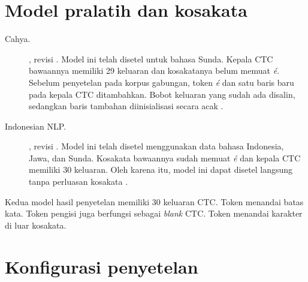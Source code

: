 \clearpage
\section{Model pralatih dan kosakata}

\begin{description}
  \item[Cahya.] , revisi . Model ini telah disetel untuk bahasa Sunda. Kepala CTC bawaannya memiliki 29 keluaran dan kosakatanya belum memuat \textit{é}. Sebelum penyetelan pada korpus gabungan, token \textit{é} dan satu baris baru pada kepala CTC ditambahkan. Bobot keluaran yang sudah ada disalin, sedangkan baris tambahan diinisialisasi secara acak \cite{cahyamodel,cahyaresep,repoasr}.
  \item[Indonesian NLP.] , revisi . Model ini telah disetel menggunakan data bahasa Indonesia, Jawa, dan Sunda. Kosakata bawaannya sudah memuat \textit{é} dan kepala CTC memiliki 30 keluaran. Oleh karena itu, model ini dapat disetel langsung tanpa perluasan kosakata \cite{nlpmodel,repoasr}.
\end{description}

Kedua model hasil penyetelan memiliki 30 keluaran CTC. Token \kode{|} menandai batas kata. Token pengisi \kode{[PAD]} juga berfungsi sebagai \textit{blank} CTC. Token \kode{[UNK]} menandai karakter di luar kosakata.

\section{Konfigurasi penyetelan}


